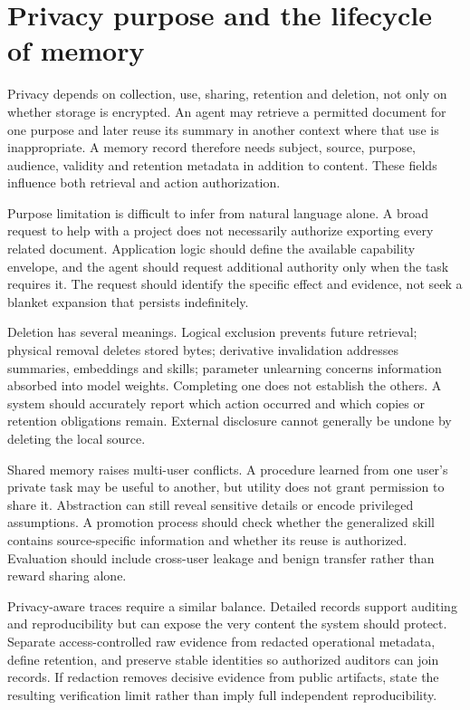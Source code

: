 \section{Privacy purpose and the lifecycle of memory}\label{sec:C29:privacy}
Privacy depends on collection, use, sharing, retention and deletion, not only on whether storage is encrypted. An agent may retrieve a permitted document for one purpose and later reuse its summary in another context where that use is inappropriate. A memory record therefore needs subject, source, purpose, audience, validity and retention metadata in addition to content. These fields influence both retrieval and action authorization.

Purpose limitation is difficult to infer from natural language alone. A broad request to help with a project does not necessarily authorize exporting every related document. Application logic should define the available capability envelope, and the agent should request additional authority only when the task requires it. The request should identify the specific effect and evidence, not seek a blanket expansion that persists indefinitely.

Deletion has several meanings. Logical exclusion prevents future retrieval; physical removal deletes stored bytes; derivative invalidation addresses summaries, embeddings and skills; parameter unlearning concerns information absorbed into model weights. Completing one does not establish the others. A system should accurately report which action occurred and which copies or retention obligations remain. External disclosure cannot generally be undone by deleting the local source.

Shared memory raises multi-user conflicts. A procedure learned from one user's private task may be useful to another, but utility does not grant permission to share it. Abstraction can still reveal sensitive details or encode privileged assumptions. A promotion process should check whether the generalized skill contains source-specific information and whether its reuse is authorized. Evaluation should include cross-user leakage and benign transfer rather than reward sharing alone.

Privacy-aware traces require a similar balance. Detailed records support auditing and reproducibility but can expose the very content the system should protect. Separate access-controlled raw evidence from redacted operational metadata, define retention, and preserve stable identities so authorized auditors can join records. If redaction removes decisive evidence from public artifacts, state the resulting verification limit rather than imply full independent reproducibility.


